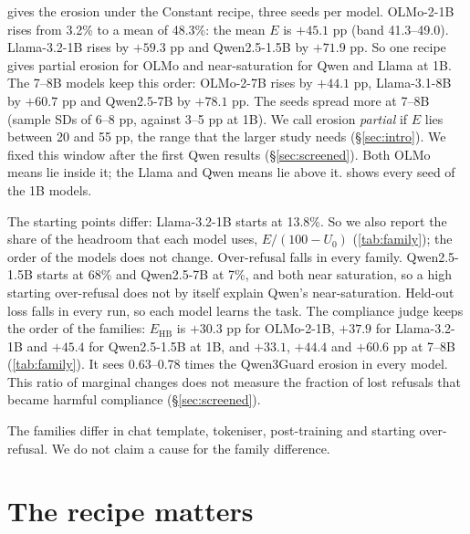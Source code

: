 \documentclass[11pt]{article}
\newcommand{\Uo}{U_0}
\newcommand{\Ehb}{E_{\mathrm{HB}}}
\begin{document}
 gives the erosion under the Constant recipe, three seeds per
model. OLMo-2-1B rises from 3.2\% to a mean of 48.3\%: the mean $E$ is $+45.1$
pp (band 41.3--49.0). Llama-3.2-1B rises by $+59.3$ pp and Qwen2.5-1.5B by
$+71.9$ pp. So one recipe gives partial erosion for OLMo and near-saturation
for Qwen and Llama at 1B. The 7--8B models keep this order: OLMo-2-7B rises by
$+44.1$ pp, Llama-3.1-8B by $+60.7$ pp and Qwen2.5-7B by $+78.1$ pp. The seeds
spread more at 7--8B (sample SDs of 6--8 pp, against 3--5 pp at 1B). We call
erosion \emph{partial} if $E$ lies between 20 and 55 pp, the range that the
larger study needs (\S\ref{sec:intro}). We fixed this window after the first
Qwen results (\S\ref{sec:screened}). Both OLMo means lie inside it; the Llama
and Qwen means lie above it.  shows every seed of the 1B
models.

The starting points differ: Llama-3.2-1B starts at 13.8\%. So we also report
the share of the headroom that each model uses, $E/(100 - \Uo)$
(\cref{tab:family}); the order of the models does not change. Over-refusal
falls in every family. Qwen2.5-1.5B starts at 68\% and Qwen2.5-7B at 7\%, and
both near saturation, so a high starting over-refusal does not by itself
explain Qwen's near-saturation. Held-out loss falls in every run, so each
model learns the task. The compliance judge keeps the order of the families: $\Ehb$ is $+30.3$
pp for OLMo-2-1B, $+37.9$ for Llama-3.2-1B and $+45.4$ for Qwen2.5-1.5B at 1B,
and $+33.1$, $+44.4$ and $+60.6$ pp at 7--8B (\cref{tab:family}). It sees
0.63--0.78 times the Qwen3Guard erosion in every model. This ratio of marginal
changes does not measure the fraction of lost refusals that became harmful
compliance (\S\ref{sec:screened}).

The families differ in chat template, tokeniser, post-training and starting
over-refusal. We do not claim a cause for the family difference.


\section{The recipe matters}
\label{sec:recipe}
\end{document}
